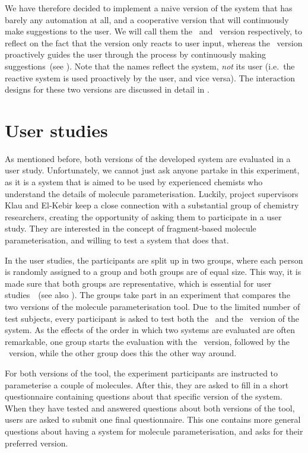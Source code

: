 We have therefore decided to implement a naive version of the system that has barely any automation at all, and a cooperative version that will continuously make suggestions to the user. We will call them the \IDa\ and \IDb\ version respectively, to reflect on the fact that the \IDa version only reacts to user input, whereas the \IDb\ version proactively guides the user through the process by continuously making suggestions~(see ). Note that the names reflect the system, \emph{not} its user (i.e.\ the reactive system is used proactively by the user, and vice versa). The interaction designs for these two versions are discussed in detail in .



\vspace{-.2em}
\section{User studies}
\vspace{-.2em}
As mentioned before, both versions of the developed system are evaluated in a user study. Unfortunately, we cannot just ask anyone partake in this experiment, as it is a system that is aimed to be used by experienced chemists who understand the details of molecule parameterisation. Luckily, project supervisors Klau and El-Kebir keep a close connection with a substantial group of chemistry researchers, creating the opportunity of asking them to participate in a user study. They are interested in the concept of fragment-based molecule parameterisation, and willing to test a system that does that.

In the user studies, the participants are split up in two groups, where each person is randomly assigned to a group and both groups are of equal size. This way, it is made sure that both groups are representative, which is essential for user studies~\cite{wohlin2003empirical}~(see also ). The groups take part in an experiment that compares the two versions of the molecule parameterisation tool. Due to the limited number of test subjects, every participant is asked to test both the \IDa\ and the \IDb\ version of the system. As the effects of the order in which two systems are evaluated are often remarkable, one group starts the evaluation with the \IDa\ version, followed by the \IDb\ version, while the other group does this the other way around.

For both versions of the tool, the experiment participants are instructed to parameterise a couple of molecules. After this, they are asked to fill in a short questionnaire containing questions about that specific version of the system. When they have tested and answered questions about both versions of the tool, users are asked to submit one final questionnaire. This one contains more general questions about having a system for molecule parameterisation, and asks for their preferred version.

